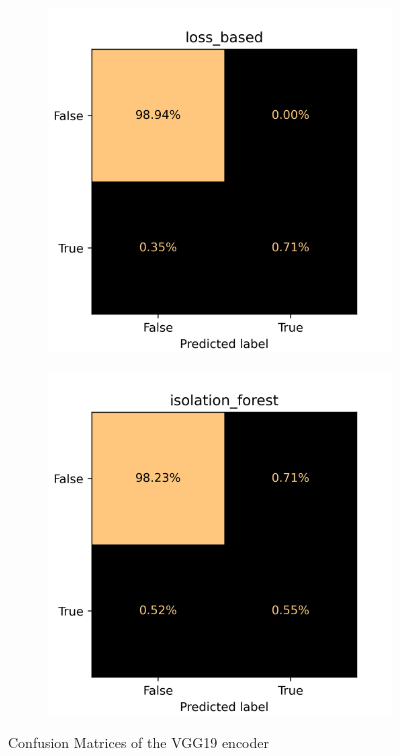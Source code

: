 \begin{figure}[!ht]
    \centering
    \begin{subfigure}{0.4\textwidth}
        \centering
        \includegraphics[width=\textwidth]{./results/vgg19_vgg19/20230510_172958_loss_based_cm.png}
    \end{subfigure}
    \begin{subfigure}{0.4\textwidth}
        \centering
        \includegraphics[width=\textwidth]{./results/vgg19_vgg19/20230510_172958_isolation_forest_cm.png}
    \end{subfigure}
    \caption{Confusion Matrices of the VGG19 encoder}
    \label{fig:vgg19_cm}
\end{figure}